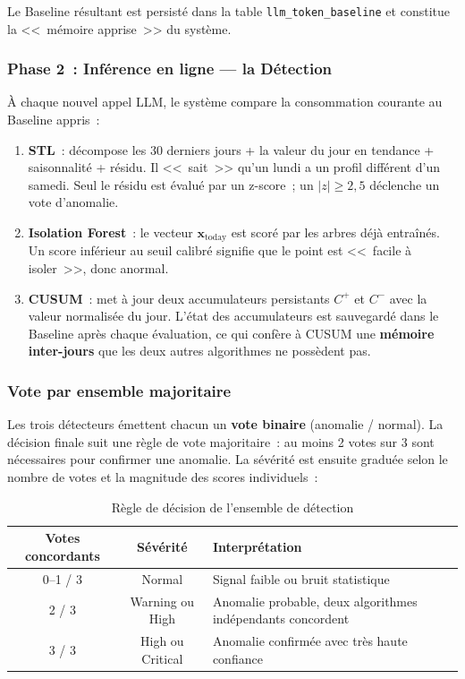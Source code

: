 Le Baseline résultant est persisté dans la table \texttt{llm\_token\_baseline} et constitue la <<~mémoire apprise~>> du système.

\subsubsection{Phase 2~: Inférence en ligne --- la Détection}

À chaque nouvel appel LLM, le système compare la consommation courante au Baseline appris~:

\begin{enumerate}[noitemsep]
    \item \textbf{STL}~: décompose les 30 derniers jours + la valeur du jour en tendance + saisonnalité + résidu. Il <<~sait~>> qu'un lundi a un profil différent d'un samedi. Seul le résidu est évalué par un z-score~; un $|z| \geq 2{,}5$ déclenche un vote d'anomalie.
    \item \textbf{Isolation Forest}~: le vecteur $\mathbf{x}_{\text{today}}$ est scoré par les arbres déjà entraînés. Un score inférieur au seuil calibré signifie que le point est <<~facile à isoler~>>, donc anormal.
    \item \textbf{CUSUM}~: met à jour deux accumulateurs persistants $C^+$ et $C^-$ avec la valeur normalisée du jour. L'état des accumulateurs est sauvegardé dans le Baseline après chaque évaluation, ce qui confère à CUSUM une \textbf{mémoire inter-jours} que les deux autres algorithmes ne possèdent pas.
\end{enumerate}

\subsubsection{Vote par ensemble majoritaire}

Les trois détecteurs émettent chacun un \textbf{vote binaire} (anomalie / normal). La décision finale suit une règle de vote majoritaire~: au moins 2 votes sur 3 sont nécessaires pour confirmer une anomalie. La sévérité est ensuite graduée selon le nombre de votes et la magnitude des scores individuels~:

\begin{table}[H]
\centering
\caption{Règle de décision de l'ensemble de détection}
\label{tab:ensemble_voting}
\begin{tabularx}{\textwidth}{|c|c|X|}
\hline
\textbf{Votes concordants} & \textbf{Sévérité} & \textbf{Interprétation} \\
\hline
0--1 / 3 & Normal & Signal faible ou bruit statistique \\
\hline
2 / 3 & Warning ou High & Anomalie probable, deux algorithmes indépendants concordent \\
\hline
3 / 3 & High ou Critical & Anomalie confirmée avec très haute confiance \\
\hline
\end{tabularx}
\end{table}

